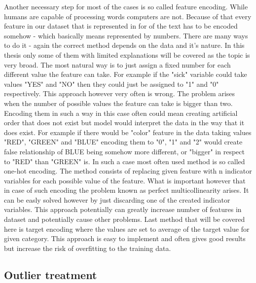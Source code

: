 \documentclass[a4paper,twoside,12pt]{book}
\begin{document}
Another necessary step for most of the cases is so called feature encoding. While humans are capable of processing words computers are not. Because of that every feature in our dataset that is represented in for of the text has to be encoded somehow - which basically means represented by numbers.
There are many ways to do it - again the correct method depends on the data and it's nature. 
In this thesis only some of them with limited explanations will be covered as the topic is very broad.
The most natural way is to just assign a fixed number for each different value the feature can take. For example if the "sick" variable could take values "YES" and "NO" then they could just be assigned to "1" and "0" respectively. This approach however very often is wrong. The problem arises when the number of possible values the feature can take is bigger than two. Encoding them in such a way in this case often could mean creating artificial order that does not exist but model would interpret the data in the way that it does exist. For example if there would be "color" feature in the data taking values "RED", "GREEN" and "BLUE" encoding them to "0", "1" and "2" would create false relationship of BLUE being somehow more different, or "bigger" in respect to "RED" than "GREEN" is.
In such a case most often used method is so called one-hot encoding. 
The method consists of replacing given feature with n indicator variables for each possible value of the feature. What is important however that in case of such encoding the problem known as perfect multicollinearity\cite{alin2010multicollinearity} arises. It can be easly solved however by just discarding one of the created indicator variables. This approach potentially can greatly increase number of features in dataset and potentially cause other problems.
Last method that will be covered here is target encoding where the values are set to average of the target value for given category. This approach is easy to implement and often gives good results but increase the risk of overfitting to the training data.

\subsection{Outlier treatment}
\end{document}
